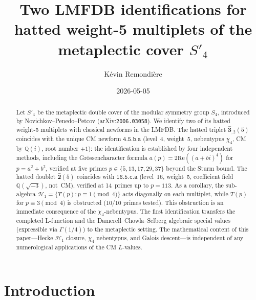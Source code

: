 \documentclass[12pt]{amsart}
\theoremstyle{definition}
\newcommand{\Q}{\mathbb{Q}}
\newcommand{\lmfdb}[1]{\texttt{#1}}  %
\newcommand{\hhat}[1]{\widehat{\mathbf{#1}}}  %
\newcommand{\HH}{\mathcal{H}_1}      %
\renewcommand{\Re}{\mathrm{Re}}
\begin{document}
\title[Two LMFDB IDs for hatted weight-5 of $S'_4$]{Two LMFDB
       identifications for hatted weight-5 multiplets
       of the metaplectic cover $S'_4$}

\author{K\'evin Remondi\`ere}
\address{Independent researcher}
\date{2026-05-05}


\begin{abstract}
Let $S'_4$ be the metaplectic double cover of the modular symmetry group
$S_4$, introduced by Novichkov--Penedo--Petcov (arXiv:\texttt{2006.03058}).
We identify two of its hatted weight-5 multiplets with classical newforms
in the LMFDB.
The hatted triplet $\hhat{3}_{,2}(5)$ coincides with the unique CM
newform $\lmfdb{4.5.b.a}$ (level~4, weight~5, nebentypus $\chi_4$,
CM by $\Q(i)$, root number $+1$): the identification is established
by four independent methods, including the Gr\"ossencharacter formula
$a(p)=2\Re((a+bi)^4)$ for $p=a^2+b^2$, verified at five primes
$p\in\{5,13,17,29,37\}$ beyond the Sturm bound.
The hatted doublet $\hhat{2}(5)$ coincides with $\lmfdb{16.5.c.a}$
(level~16, weight~5, coefficient field $\Q(\sqrt{-3})$, not~CM),
verified at 14~primes up to $p=113$.
As a corollary, the sub-algebra $\HH=\{T(p):p\equiv 1\pmod{4}\}$
acts diagonally on each multiplet, while $T(p)$ for $p\equiv 3\pmod{4}$
is obstructed (10/10 primes tested).  This obstruction is an immediate
consequence of the $\chi_4$-nebentypus.  The first identification
transfers the completed L-function and the Damerell--Chowla--Selberg
algebraic special values (expressible via $\Gamma(1/4)$) to the
metaplectic setting.
The mathematical content of this paper---Hecke $\HH$ closure,
$\chi_4$ nebentypus, and Galois descent---is independent of any
numerological applications of the CM $L$-values.
\end{abstract}

\maketitle

\setcounter{tocdepth}{1}
\tableofcontents

\section{Introduction}
\end{document}
